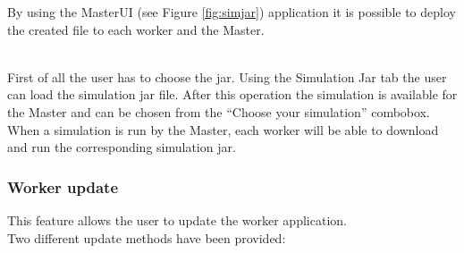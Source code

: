 \documentclass{article}
\begin{document}
By using the  MasterUI (see Figure
\ref{fig:simjar})  application it is possible to deploy the created file to each worker and the Master.
\begin{figure}[h]
\end{figure}\\
First of all the user has to choose the jar. Using the Simulation Jar tab the user can load the simulation jar file.
After this operation the simulation is available for the Master and can be chosen from the ``Choose your simulation'' combobox.
When a simulation is run by the Master, each worker will be able to download and run the corresponding simulation jar. 

\subsubsection{Worker update}
This feature allows the user to update the worker application.\\ 

Two different update methods have been provided:
\end{document}
